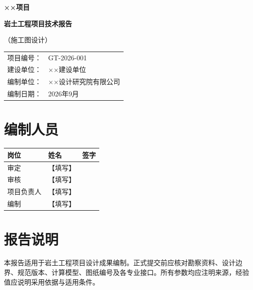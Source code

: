 \documentclass[UTF8,zihao=-4,oneside]{ctexrep}
\newcommand{\ProjectName}{××项目}
\newcommand{\ReportName}{岩土工程项目技术报告}
\newcommand{\ClientName}{××建设单位}
\newcommand{\DesignerName}{××设计研究院有限公司}
\newcommand{\ProjectStage}{施工图设计}
\newcommand{\ProjectNumber}{GT-2026-001}
\newcommand{\ReportDate}{2026年9月}
\newcommand{\placeholder}[1]{\textcolor{documentblack}{【#1】}}
\begin{document}
\begin{titlepage}
  \thispagestyle{empty}
  \centering
  \vspace*{18mm}
  {\bfseries \ProjectName\par}
  \vspace{12mm}
  {\bfseries \ReportName\par}
  \vspace{8mm}
  {（\ProjectStage）\par}
  \vfill
  \renewcommand{\arraystretch}{1.6}
  \begin{tabular}{>{\raggedleft\arraybackslash}p{36mm}p{80mm}}
    项目编号： & \ProjectNumber \\
    建设单位： & \ClientName \\
    编制单位： & \DesignerName \\
    编制日期： & \ReportDate \\
  \end{tabular}
  \vspace*{18mm}
\end{titlepage}

\chapter*{编制人员}
\begin{table}[H]
  \centering
  \renewcommand{\arraystretch}{1.7}
  \begin{tabularx}{\textwidth}{>{\centering\arraybackslash}p{25mm}X>{\centering\arraybackslash}p{35mm}}
    \toprule
    岗位 & 姓名 & 签字 \\
    \midrule
    审定 & \placeholder{填写} & \\
    审核 & \placeholder{填写} & \\
    项目负责人 & \placeholder{填写} & \\
    编制 & \placeholder{填写} & \\
    \bottomrule
  \end{tabularx}
\end{table}

\chapter*{报告说明}
本报告适用于岩土工程项目设计成果编制。正式提交前应核对勘察资料、设计边界、规范版本、计算模型、图纸编号及各专业接口。所有参数均应注明来源，经验值应说明采用依据与适用条件。
\end{document}
